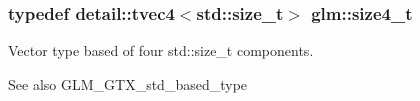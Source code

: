 \subsubsection[{size4\+\_\+t}]{\setlength{\rightskip}{0pt plus 5cm}typedef detail\+::tvec4$<$std\+::size\+\_\+t$>$ {\bf glm\+::size4\+\_\+t}}\label{group__gtx__std__based__type_ga008fbe5ecf66e1fc6626ab9b5a38e27e}
Vector type based of four std\+::size\+\_\+t components. \begin{DoxySeeAlso}{See also}
G\+L\+M\+\_\+\+G\+T\+X\+\_\+std\+\_\+based\+\_\+type 
\end{DoxySeeAlso}

